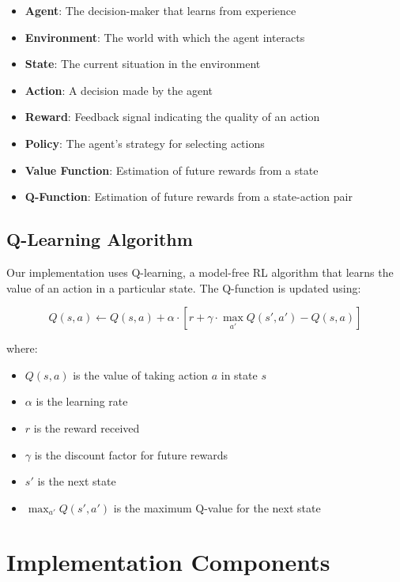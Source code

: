 \documentclass{article}
\begin{document}
\begin{itemize}
    \item \textbf{Agent}: The decision-maker that learns from experience
    \item \textbf{Environment}: The world with which the agent interacts
    \item \textbf{State}: The current situation in the environment
    \item \textbf{Action}: A decision made by the agent
    \item \textbf{Reward}: Feedback signal indicating the quality of an action
    \item \textbf{Policy}: The agent's strategy for selecting actions
    \item \textbf{Value Function}: Estimation of future rewards from a state
    \item \textbf{Q-Function}: Estimation of future rewards from a state-action pair
\end{itemize}

\subsection{Q-Learning Algorithm}

Our implementation uses Q-learning, a model-free RL algorithm that learns the value of an action in a particular state. The Q-function is updated using:

\begin{equation}
Q(s, a) \leftarrow Q(s, a) + \alpha \cdot [r + \gamma \cdot \max_{a'} Q(s', a') - Q(s, a)]
\end{equation}

where:
\begin{itemize}
    \item $Q(s, a)$ is the value of taking action $a$ in state $s$
    \item $\alpha$ is the learning rate
    \item $r$ is the reward received
    \item $\gamma$ is the discount factor for future rewards
    \item $s'$ is the next state
    \item $\max_{a'} Q(s', a')$ is the maximum Q-value for the next state
\end{itemize}

\section{Implementation Components}
\end{document}
